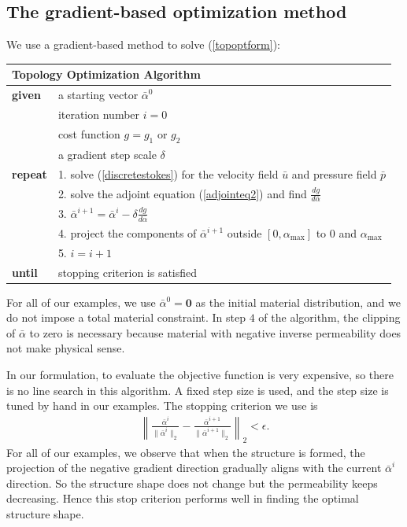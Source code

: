 \documentclass[times]{fldauth}
\begin{document}
\subsection{The gradient-based optimization method}
\label{sec:grad-based-optim}

We use a gradient-based method to solve (\ref{topoptform}):
\begin{center}
  \begin{tabular}{ll}
    \multicolumn{2}{l}{\textbf{Topology Optimization Algorithm}} \\
    \hline
    \textbf{given}
    & a starting vector $\bar{\alpha}^0$ \\
    & iteration number $i=0$ \\
    & cost function $g = g_1$ or $g_2$ \\
    & a gradient step scale $\delta$ \\[0.5em]
    \textbf{repeat}
    & 1. solve (\ref{discretestokes}) for the velocity field
    $\bar{u}$ and pressure field $\bar{p}$ \\
    & 2. solve the adjoint equation (\ref{adjointeq2}) and find
    $\frac{dg}{d\bar{\alpha}}$ \\
    & 3. $\bar{\alpha}^{i+1} = 
    \bar{\alpha}^{i} - \delta \frac{dg}{d\bar{\alpha}}$ \\
    & 4. project the components of $\bar{\alpha}^{i+1}$ outside
    $[0,\alpha_\text{max}]$ to $0$ and $\alpha_\text{max}$ \\
    & 5. $i = i+1$ \\[0.5em]
    \textbf{until}
    & stopping criterion is satisfied \\
    \hline
  \end{tabular}
\end{center}
For all of our examples, we use $\bar{\alpha}^0 = \mathbf{0}$ as the
initial material distribution, and we do not impose a total material
constraint. In step $4$ of the algorithm, the clipping of
$\bar{\alpha}$ to zero is necessary because material with negative
inverse permeability does not make physical sense.

In our formulation, to evaluate the objective function is very
expensive, so there is no line search in this algorithm. A fixed step
size is used, and the step size is tuned by hand in our examples. The
stopping criterion we use is
\begin{align}
  \left\|\frac{\bar{\alpha}^i}{\|\bar{\alpha}^i\|_2}
    - \frac{\bar{\alpha}^{i+1}}{\|\bar{\alpha}^{i+1}\|_2}\right\|_2
  < \epsilon.
\end{align}
For all of our examples, we observe that when the structure is formed,
the projection of the negative gradient direction gradually aligns
with the current $\bar{\alpha}^i$ direction. So the structure shape
does not change but the permeability keeps decreasing. Hence this stop
criterion performs well in finding the optimal structure shape.
\end{document}

